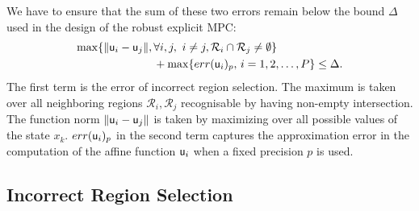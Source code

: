 We have to ensure that the sum of these two errors remain below the bound $\Delta$
used in the design of the robust explicit MPC:
\begin{align}
  \max\{\|\mathsf u_{{i}}-\mathsf u_{{j}}\|,\,&\forall i,j,\,\, i\neq j, \mathcal{R}_{i}\cap\mathcal{R}_{j}\neq\emptyset\} \nonumber\\
  &+  \max\{err(\mathsf u_{{i}})_{p},\, i=1,2,\ldots,P\} \le \Delta.
  \label{eq:delta}
\end{align}
The first term is the error of incorrect region selection. The maximum is taken over all neighboring regions $\mathcal R_i,\mathcal R_j$ recognisable by having non-empty intersection. The function norm $\|\mathsf u_{{i}}-\mathsf u_{{j}}\|$ is taken by maximizing over all possible values of the state $x_k$. 
$err(\mathsf u_{{i}})_{p}$ in
the second term captures the approximation error in the computation of the affine function $\mathsf u_{{i}}$ when a fixed precision $p$ is used.

\subsection{Incorrect Region Selection}

